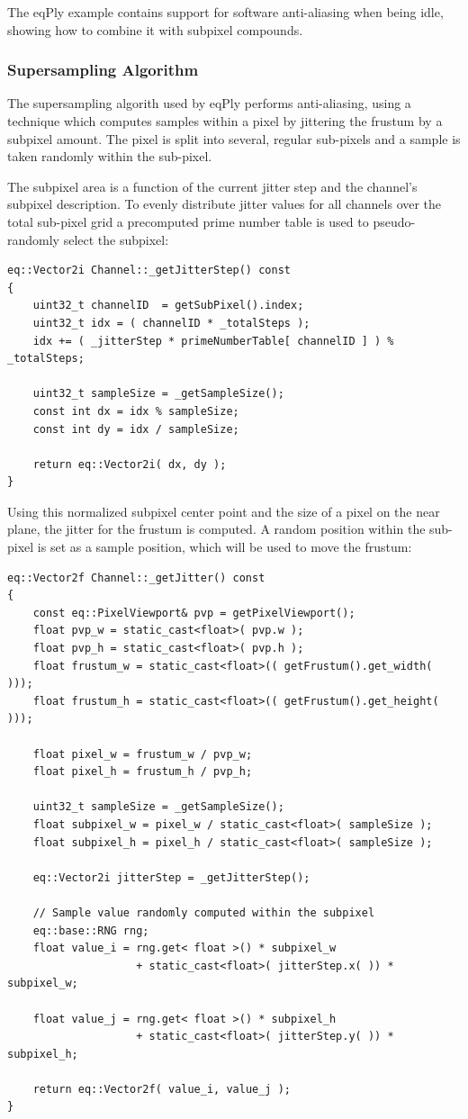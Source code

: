 \documentclass[10pt,a4]{scrartcl}
\begin{document}
The eqPly example contains support for software anti-aliasing when being idle,
showing how to combine it with subpixel compounds.

\subsubsection{Supersampling Algorithm}

The supersampling algorith used by eqPly performs anti-aliasing, using a
technique which computes samples within a pixel by jittering the frustum by a
subpixel amount. The pixel is split into several, regular sub-pixels and a
sample is taken randomly within the sub-pixel.

The subpixel area is a function of the current jitter step and the channel's
\textsf{subpixel} description. To evenly distribute jitter values for all
channels over the total sub-pixel grid a precomputed prime number table is used
to pseudo-randomly select the subpixel:

{\footnotesize\begin{lstlisting}
eq::Vector2i Channel::_getJitterStep() const
{
    uint32_t channelID  = getSubPixel().index;
    uint32_t idx = ( channelID * _totalSteps );
    idx += ( _jitterStep * primeNumberTable[ channelID ] ) % _totalSteps;

    uint32_t sampleSize = _getSampleSize();
    const int dx = idx % sampleSize;
    const int dy = idx / sampleSize;

    return eq::Vector2i( dx, dy );
}
\end{lstlisting}}

Using this normalized subpixel center point and the size of a pixel on the near
plane, the jitter for the frustum is computed. A random position within the
sub-pixel is set as a sample position, which will be used to move the frustum:

{\footnotesize\begin{lstlisting}
eq::Vector2f Channel::_getJitter() const
{
    const eq::PixelViewport& pvp = getPixelViewport();
    float pvp_w = static_cast<float>( pvp.w );
    float pvp_h = static_cast<float>( pvp.h );
    float frustum_w = static_cast<float>(( getFrustum().get_width( )));
    float frustum_h = static_cast<float>(( getFrustum().get_height( )));

    float pixel_w = frustum_w / pvp_w;
    float pixel_h = frustum_h / pvp_h;

    uint32_t sampleSize = _getSampleSize();
    float subpixel_w = pixel_w / static_cast<float>( sampleSize );
    float subpixel_h = pixel_h / static_cast<float>( sampleSize );

    eq::Vector2i jitterStep = _getJitterStep();

    // Sample value randomly computed within the subpixel
    eq::base::RNG rng;
    float value_i = rng.get< float >() * subpixel_w
                    + static_cast<float>( jitterStep.x( )) * subpixel_w;

    float value_j = rng.get< float >() * subpixel_h
                    + static_cast<float>( jitterStep.y( )) * subpixel_h;

    return eq::Vector2f( value_i, value_j );
}
\end{lstlisting}}
\end{document}
